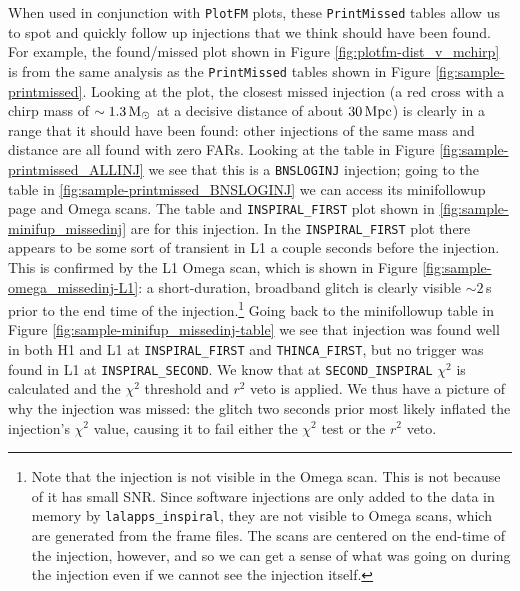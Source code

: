 When used in conjunction with \texttt{PlotFM} plots, these \texttt{PrintMissed} tables
allow us to spot and quickly follow up injections that we think should have
been found. For example, the found/missed plot shown in Figure
\ref{fig:plotfm-dist_v_mchirp} is from the same analysis as the \texttt{PrintMissed}
tables shown in Figure \ref{fig:sample-printmissed}. Looking at the plot, the
closest missed injection (a red cross with a chirp mass of $\sim1.3\,\mathrm{M_\odot}$ at
a decisive distance of about $30\,\mathrm{Mpc}$) is clearly in a range that it should
have been found: other injections of the same mass and distance are all found
with zero \acp{FAR}. Looking at the table in Figure
\ref{fig:sample-printmissed_ALLINJ} we see that this is a \verb|BNSLOGINJ|
injection; going to the table in \ref{fig:sample-printmissed_BNSLOGINJ} we can
access its minifollowup page and Omega scans. The table and
\verb|INSPIRAL_FIRST| plot shown in \ref{fig:sample-minifup_missedinj} are for
this injection. In the \verb|INSPIRAL_FIRST| plot there appears to be some sort
of transient in L1 a couple seconds before the injection. This is confirmed by
the L1 Omega scan, which is shown in Figure
\ref{fig:sample-omega_missedinj-L1}: a short-duration, broadband glitch is
clearly visible $\sim2\,$s prior to the end time of the
injection.\footnote{Note that the injection is not visible in the Omega scan.
This is not because of it has small \ac{SNR}. Since software injections are
only added to the data in memory by \texttt{lalapps\_inspiral}, they are not
visible to Omega scans, which are generated from the frame files. The scans are
centered on the end-time of the injection, however, and so we can get a sense
of what was going on during the injection even if we cannot see the injection
itself.} Going back to the minifollowup table in Figure
\ref{fig:sample-minifup_missedinj-table} we see that injection was found well
in both H1 and L1 at \verb|INSPIRAL_FIRST| and \verb|THINCA_FIRST|, but no
trigger was found in L1 at \verb|INSPIRAL_SECOND|. We know that at
\verb|SECOND_INSPIRAL| $\chi^2$ is calculated and the $\chi^2$ threshold and
$r^2$ veto is applied. We thus have a picture of why the injection was missed:
the glitch two seconds prior most likely inflated the injection's $\chi^2$
value, causing it to fail either the $\chi^2$ test or the $r^2$ veto. 

